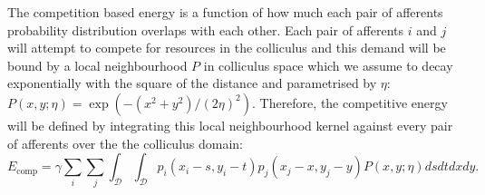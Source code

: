 The competition based energy is a function of how much each pair of afferents probability distribution overlaps with each other. Each pair of afferents $i$ and $j$ will attempt to compete for resources in the colliculus and this demand will be bound by a local neighbourhood $P$ in colliculus space which we assume to decay exponentially with the square of the distance and parametrised by $\eta$: $P(x,y; \eta) = \exp(-(x^2+y^2)/(2\eta)^2)$. Therefore, the competitive energy will be defined by integrating this local neighbourhood kernel against every pair of afferents over the the colliculus domain:
\begin{equation}
E_\text{comp} = \gamma \sum_i \sum_j \int_{\mathcal{D}} \int_{\mathcal{D}}p_i(x_i - s, y_i - t)p_j(x_j-x,y_j-y) P(x,y; \eta) ds dt dx dy.
\end{equation}